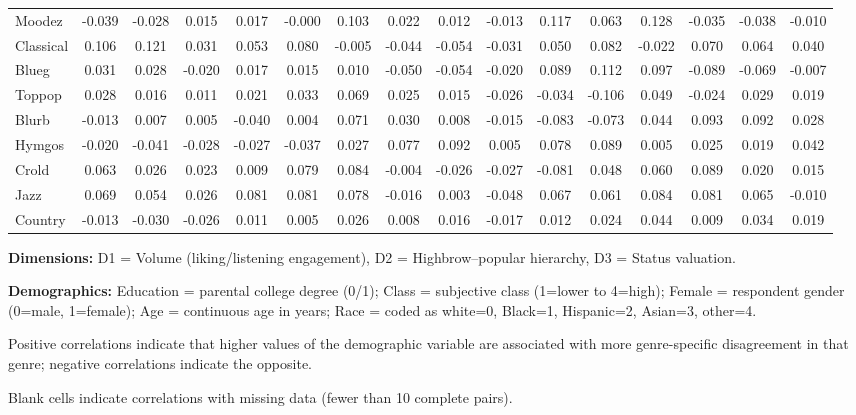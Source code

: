 \begin{table}[htbp]
\begin{tabularx}{\textwidth}{@{}l|ccc|ccc|ccc|ccc|ccc@{}}
Moodez & -0.039 & -0.028 & 0.015 & 0.017 & -0.000 & 0.103 & 0.022 & 0.012 & -0.013 & 0.117 & 0.063 & 0.128 & -0.035 & -0.038 & -0.010 \\
Classical & 0.106 & 0.121 & 0.031 & 0.053 & 0.080 & -0.005 & -0.044 & -0.054 & -0.031 & 0.050 & 0.082 & -0.022 & 0.070 & 0.064 & 0.040 \\
Blueg & 0.031 & 0.028 & -0.020 & 0.017 & 0.015 & 0.010 & -0.050 & -0.054 & -0.020 & 0.089 & 0.112 & 0.097 & -0.089 & -0.069 & -0.007 \\
Toppop & 0.028 & 0.016 & 0.011 & 0.021 & 0.033 & 0.069 & 0.025 & 0.015 & -0.026 & -0.034 & -0.106 & 0.049 & -0.024 & 0.029 & 0.019 \\
Blurb & -0.013 & 0.007 & 0.005 & -0.040 & 0.004 & 0.071 & 0.030 & 0.008 & -0.015 & -0.083 & -0.073 & 0.044 & 0.093 & 0.092 & 0.028 \\
Hymgos & -0.020 & -0.041 & -0.028 & -0.027 & -0.037 & 0.027 & 0.077 & 0.092 & 0.005 & 0.078 & 0.089 & 0.005 & 0.025 & 0.019 & 0.042 \\
Crold & 0.063 & 0.026 & 0.023 & 0.009 & 0.079 & 0.084 & -0.004 & -0.026 & -0.027 & -0.081 & 0.048 & 0.060 & 0.089 & 0.020 & 0.015 \\
Jazz & 0.069 & 0.054 & 0.026 & 0.081 & 0.081 & 0.078 & -0.016 & 0.003 & -0.048 & 0.067 & 0.061 & 0.084 & 0.081 & 0.065 & -0.010 \\
Country & -0.013 & -0.030 & -0.026 & 0.011 & 0.005 & 0.026 & 0.008 & 0.016 & -0.017 & 0.012 & 0.024 & 0.044 & 0.009 & 0.034 & 0.019 \\
\bottomrule
\end{tabularx}
\end{table}

\begin{tablenotes}
\small
\item \textbf{Dimensions:} D1 = Volume (liking/listening engagement), D2 = Highbrow--popular hierarchy, D3 = Status valuation.
\item \textbf{Demographics:} Education = parental college degree (0/1); Class = subjective class (1=lower to 4=high); Female = respondent gender (0=male, 1=female); Age = continuous age in years; Race = coded as white=0, Black=1, Hispanic=2, Asian=3, other=4.
\item Positive correlations indicate that higher values of the demographic variable are associated with more genre-specific disagreement in that genre; negative correlations indicate the opposite.
\item Blank cells indicate correlations with missing data (fewer than 10 complete pairs).
\end{tablenotes}

